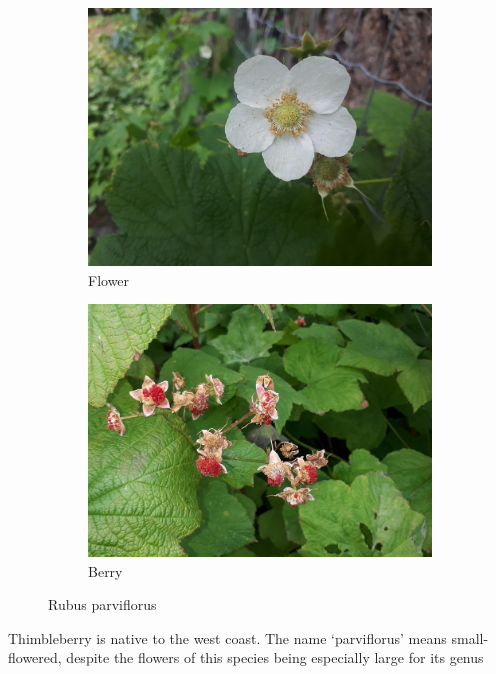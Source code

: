 \begin{figure}
\begin{subfigure}{0.48\textwidth}
    \includegraphics[width=\textwidth]{rubus/parviflorus_flower_01}
    \caption{Flower}
    \label{fig:rub:parviflorus:flower}
\end{subfigure}
\hfill
\begin{subfigure}{0.48\textwidth}
    \includegraphics[width=\textwidth]{rubus/parviflorus_berry_01}
    \caption{Berry}
    \label{fig:rub:parviflorus:berry}
\end{subfigure}

        
\caption{Rubus parviflorus}
\label{fig:rub:parviflorus}
\end{figure}

Thimbleberry is native to the west coast. The name `parviflorus' means small-flowered, despite the flowers of this species being especially large for its genus

